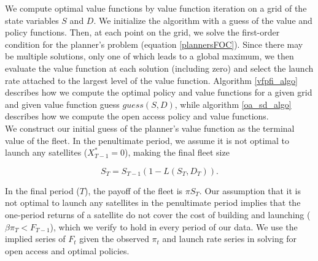 \documentclass[12pt]{article}
\begin{document}
We compute optimal value functions by value function iteration on a grid of the state variables $S$ and $D$. We initialize the algorithm with a guess of the value and policy functions. Then, at each point on the grid, we solve the first-order condition for the planner's problem (equation \ref{plannersFOC}). Since there may be multiple solutions, only one of which leads to a global maximum, we then evaluate the value function at each solution (including zero) and select the launch rate attached to the largest level of the value function. Algorithm \ref{vfpfi_algo} describes how we compute the optimal policy and value functions for a given grid and given value function guess $guess(S,D)$, while algorithm \ref{oa_sd_algo} describes how we compute the open access policy and value functions. \\

We construct our initial guess of the planner's value function as the terminal value of the fleet. In the penultimate period, we assume it is not optimal to launch any satellites ($X^*_{T-1} = 0$), making the final fleet size 

\[ S_T = S_{T-1}(1-L(S_T,D_T)) .\]

In the final period ($T$), the payoff of the fleet is $\pi S_T$. Our assumption that it is not optimal to launch any satellites in the penultimate period implies that the one-period returns of a satellite do not cover the cost of building and launching ($\beta \pi_T < F_{T-1}$), which we verify to hold in every period of our data. We use the implied series of $F_t$ given the observed $\pi_t$ and launch rate series in solving for open access and optimal policies.

\end{document}
